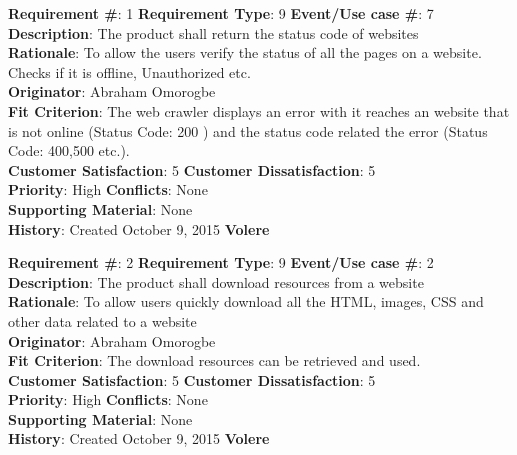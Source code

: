 \documentclass[12pt]{article}
\begin{document}
\begin{framed}

\textbf{Requirement \#}: 1 \hfill \textbf{Requirement Type}: 9 \hfill\textbf{Event/Use case \#}: 7 \hfill\\
\textbf{Description}:  The product shall return the status code of websites\\
\textbf{Rationale}: To allow the users verify the status of all the pages on a website. Checks if it is offline, Unauthorized etc.\\
\textbf{Originator}: Abraham Omorogbe\\
\textbf{Fit Criterion}: The web crawler displays an error with it reaches an website that is not online (Status Code: 200 ) and the status code related the error (Status Code: 400,500 etc.).	\\
\textbf{Customer Satisfaction}: 5 \hfill 	\textbf{Customer Dissatisfaction}: 5 \hfill\\
\textbf{Priority}: High \hfill \textbf{Conflicts}: None \hfill 		\\
\textbf{Supporting Material}: None\\
\textbf{History}: Created October 9, 2015 \hfill	 \textbf{Volere}\hfill

\end{framed}

\begin{framed}
\textbf{Requirement \#}: 2 \hfill \textbf{Requirement Type}: 9 \hfill\textbf{Event/Use case \#}: 2 \hfill\\
\textbf{Description}:  The product shall download resources from a website\\
\textbf{Rationale}: To allow users quickly download all the HTML, images, CSS and other data related to a website\\
\textbf{Originator}: Abraham Omorogbe\\
\textbf{Fit Criterion}:  The download resources can be retrieved and used.\\
\textbf{Customer Satisfaction}: 5 \hfill 	\textbf{Customer Dissatisfaction}: 5 \hfill\\
\textbf{Priority}: High \hfill \textbf{Conflicts}: None \hfill 		\\
\textbf{Supporting Material}: None\\
\textbf{History}: Created October 9, 2015 \hfill	 \textbf{Volere}\hfill

\end{framed}
\end{document}
